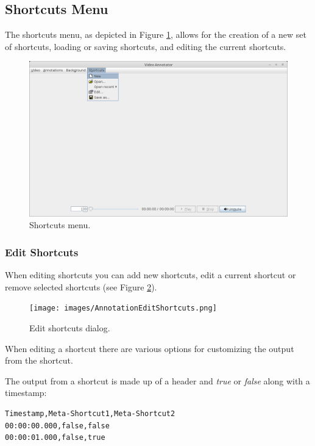 \documentclass[a4paper]{book}
\begin{document}
\subsection{Shortcuts Menu}
The shortcuts menu, as depicted in Figure \ref{AnnotatorShortcutsMenu}, allows
for the creation of a new set of shortcuts, loading or saving shortcuts, and
editing the current shortcuts.

\begin{figure}[htb]
  \centering
  \includegraphics[width=12.0cm]{images/AnnotatorShortcutsMenu.png}
  \caption{Shortcuts menu.}
  \label{AnnotatorShortcutsMenu}
\end{figure}

\subsubsection{Edit Shortcuts}
When editing shortcuts you can add new shortcuts, edit a current shortcut or
remove selected shortcuts (see Figure \ref{AnnotationEditShortcuts}).

\begin{figure}[htb]
  \centering
  \texttt{[image: images/AnnotationEditShortcuts.png]}
  \caption{Edit shortcuts dialog.}
  \label{AnnotationEditShortcuts}
\end{figure}

When editing a shortcut there are various options for customizing the output
from the shortcut.

The output from a shortcut is made up of a header and \textit{true} or
\textit{false} along with a timestamp:

\begin{verbatim}
Timestamp,Meta-Shortcut1,Meta-Shortcut2
00:00:00.000,false,false
00:00:01.000,false,true
\end{verbatim}
\end{document}
